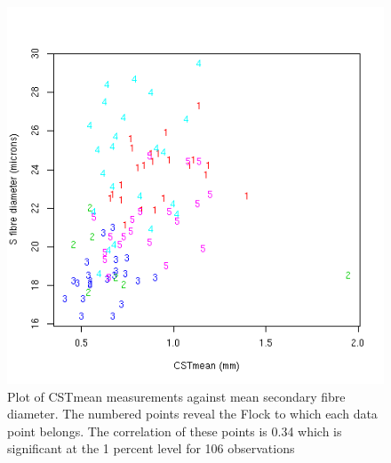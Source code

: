 %

\begin{figure}[!h]
  \centering
  \includegraphics[width=1.0\textwidth]{cstds.png}
  \caption{Plot of CSTmean measurements against mean secondary fibre diameter. The numbered points reveal the Flock to which each data point belongs. The correlation of these points is 0.34 which is significant at the 1 percent level for 106 observations}
  \label{fig:cstds}
\end{figure}

%

